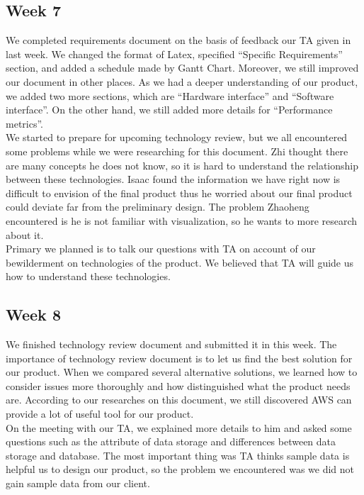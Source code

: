 \subsection{Week 7}
We completed requirements document on the basis of feedback our TA given in last week. We changed the format of Latex, specified “Specific Requirements” section, and added a schedule made by Gantt Chart. Moreover, we still improved our document in other places. As we had a deeper understanding of our product, we added two more sections, which are “Hardware interface” and “Software interface”. On the other hand, we still added more details for “Performance metrics”.\\
 
\noindent  We started to prepare for upcoming technology review, but we all encountered some problems while we were researching for this document. Zhi thought there are many concepts he does not know, so it is hard to understand the relationship between these technologies. Isaac found the information we have right now is difficult to envision of the final product thus he worried about our final product could deviate far from the preliminary design. The problem Zhaoheng encountered is he is not familiar with visualization, so he wants to more research about it.\\
 
\noindent Primary we planned is to talk our questions with TA on account of our bewilderment on technologies of the product. We believed that TA will guide us how to understand these technologies.

\subsection{Week 8}
We finished technology review document and submitted it in this week. The importance of technology review document is to let us find the best solution for our product. When we compared several alternative solutions, we learned how to consider issues more thoroughly and how distinguished what the product needs are. According to our researches on this document, we still discovered AWS can provide a lot of useful tool for our product.\\
 
\noindent On the meeting with our TA, we explained more details to him and asked some questions such as the attribute of data storage and differences between data storage and database. The most important thing was TA thinks sample data is helpful us to design our product, so the problem we encountered was we did not gain sample data from our client.\\ 


